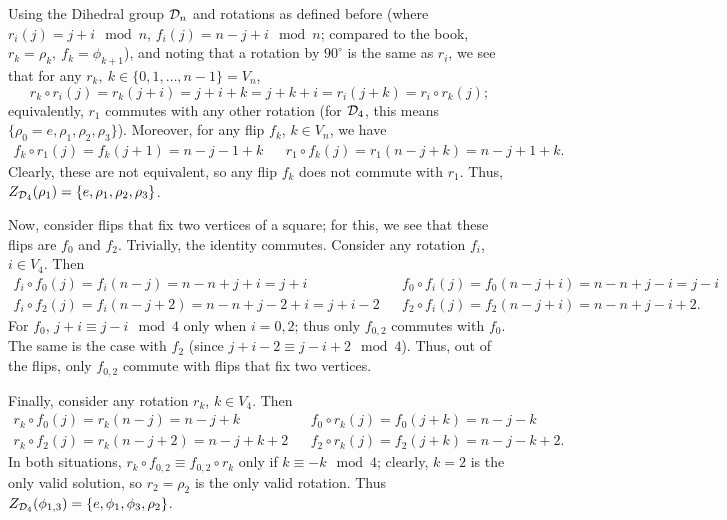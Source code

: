 \documentclass{homework}
\begin{document}
\begin{solution}
  Using the Dihedral group $\mathcal{D}_n$ and rotations as defined before (where $r_i(j)=j+i \mod{n}$,
  $f_i(j)=n-j+i \mod{n}$; compared to the book, $r_k=\rho_{k},\ f_k=\phi_{k+1}$), and noting that
  a rotation by $90^{\circ}$ is the same as $r_i$, we see that for any $r_k,\ k\in \{ 0,1,\ldots,n-1
  \}=V_n$, \[
    r_k\circ r_i(j)=r_k(j+i)=j+i+k=j+k+i=r_i(j+k)=r_i\circ r_k(j)
  ;\] equivalently, $r_1$ commutes with any other rotation (for $\mathcal{D}_4$, this means $\{
  \rho_0=e,\rho_1,\rho_2,\rho_3 \}$). Moreover, for any flip $f_k$, $k\in V_n$, we have
  \begin{align*}
    f_k\circ r_1(j)=f_k(j+1)=n-j-1+k && r_1\circ f_k(j)=r_1(n-j+k)=n-j+1+k
  .\end{align*}
  Clearly, these are not equivalent, so any flip $f_k$ does not commute with $ r_1$. Thus,
  $Z_{\mathcal{D}_4}(\rho_1)=\{ e,\rho_1,\rho_2,\rho_3 \}$.

  Now, consider flips that fix two vertices of a square; for this, we see that these flips are
  $f_0$ and $f_2$. Trivially, the identity commutes. Consider any rotation $f_i$, $i\in V_4$. Then
  \begin{align*}
    f_i\circ f_0(j)=f_i(n-j)=n-n+j+i=j+i && f_0\circ f_i(j)=f_0(n-j+i)=n-n+j-i=j-i\\
    f_i\circ f_2(j)=f_i(n-j+2)=n-n+j-2+i= j+i-2 && f_2\circ f_i(j)=f_2(n-j+i)=n-n+j-i+2
  .\end{align*}
  For $ f_0$, $j+i\equiv j-i\mod{4}$ only when $i=0,2$; thus only $f_{0,2}$ commutes with $ f_0$.
  The same is the case with $f_2$ (since $j+i-2\equiv j-i+2\mod{4}$). Thus, out of the flips, only
  $f_{0,2}$ commute with flips that fix two vertices.

  Finally, consider any rotation $r_k$, $k\in V_4$. Then
  \begin{align*}
    r_k\circ f_0(j)=r_k(n-j)=n-j+k && f_0\circ r_k(j)=f_0(j+k)=n-j-k \\
    r_k\circ f_2(j)=r_k(n-j+2)=n-j+k+2 && f_2\circ r_k(j)=f_2(j+k)=n-j-k+2
  .\end{align*}
  In both situations, $r_k\circ f_{0,2}\equiv f_{0,2}\circ r_k$ only if $k\equiv -k\mod{4}$;
  clearly, $k=2$ is the only valid solution, so $r_2=\rho_2$ is the only valid rotation. Thus
  $Z_{\mathcal{D}_4}(\phi_{1,3})=\{ e,\phi_1,\phi_3,\rho_2 \}$.




\end{solution}
\end{document}
